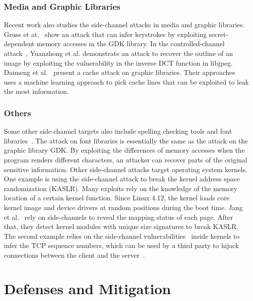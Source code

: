 \subsubsection*{Media and Graphic Libraries}
Recent work also studies the side-channel attacks in media and graphic libraries. Gruss et at.~\cite{191010} show an attack that can infer keystrokes by exploiting secret-dependent memory accesses in the GDK library. In the controlled-channel attack~\cite{xu2015controlled}, Yuanzhong et al. demonstrate an attack to recover the outline of an image by exploiting the vulnerability in the inverse DCT function in libjpeg. Daimeng et al.~\cite{wang2019unveiling} present a cache attack on graphic libraries. Their approaches uses a machine learning approach to pick cache lines that can be exploited to leak the most information.
\subsubsection*{Others}
Some other side-channel targets also include spelling checking tools and font libraries~\cite{xu2015controlled}. The attack on font libraries is essentially the same as the attack on the graphic library GDK. By exploiting the differences of memory accesses when the program renders different characters, an attacker can recover parts of the original sensitive information. Other side-channel attacks target operating system kernels. One example is using the side-channel attack to break the kernel address space randomization (KASLR).
Many exploits rely on the knowledge of the memory location of a certain kernel function. Since Linux 4.12, the kernel loads core kernel image and device drivers at random positions during the boot time. Jang et al.~\cite{jang2016breaking} rely on side-channels to reveal the mapping status of each page. After that, they detect kernel modules with unique size signatures to break KASLR. The second example relies on the side-channel vulnerabilities~\cite{cao2019principled} inside kernels to infer the TCP sequence numbers, which can be used by a third party to hijack connections between the client and the server~\cite{cao2016off}.

\section{Defenses and Mitigation}

